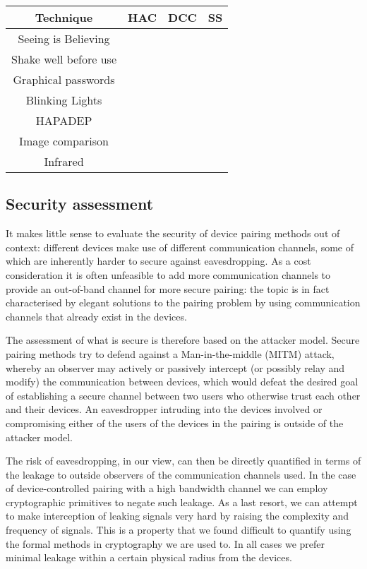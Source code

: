 \documentclass[conference, 12pt]{sty/IEEEtran}
\begin{document}
\begin{tabular}{c|c|c|c}
	Technique & HAC & DCC & SS \\
	\hline
	  Seeing is Believing &  & \checkmark &   \\
	Shake well before use &  &  & \checkmark \\
    	  Graphical passwords & \checkmark &  &  \\
	   Blinking Lights & \checkmark & \checkmark & \\
	 HAPADEP &  & \checkmark & \checkmark \\
	Image comparison & \checkmark &  & \\
	Infrared &  & \checkmark &  \\
\end{tabular}

\subsection{Security assessment}
\label{ssec:security_assessment}

It makes little sense to evaluate the security of device pairing methods out of context: different devices make use of different communication channels, some of which are inherently harder to secure against eavesdropping.
As a cost consideration it is often unfeasible to add more communication channels to provide an out-of-band channel for more secure pairing: the topic is in fact characterised by elegant solutions to the pairing problem by using communication channels that already exist in the devices.

The assessment of what is secure is therefore based on the attacker model.
Secure pairing methods try to defend against a Man-in-the-middle (MITM) attack, whereby an observer may actively or passively intercept (or possibly relay and modify) the communication between devices, which would defeat the desired goal of establishing a secure channel between two users who otherwise trust each other and their devices.
An eavesdropper intruding into the devices involved or compromising either of the users of the devices in the pairing is outside of the attacker model.

The risk of eavesdropping, in our view, can then be directly quantified in terms of the leakage to outside observers of the communication channels used.
In the case of device-controlled pairing with a high bandwidth channel we can employ cryptographic primitives to negate such leakage.
As a last resort, we can attempt to make interception of leaking signals very hard by raising the complexity and frequency of signals.
This is a property that we found difficult to quantify using the formal methods in cryptography we are used to.
In all cases we prefer minimal leakage within a certain physical radius from the devices.
\end{document}

